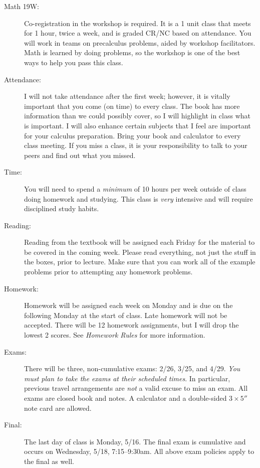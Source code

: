 \documentclass[letterpaper,12pt,fleqn]{article}
\begin{document}
\begin{description}
\item[Math 19W:] Co-registration in the workshop is required. It is a 1 unit
    class that meets for 1 hour, twice a week, and is graded CR/NC based on
    attendance. You will work in teams on precalculus problems, aided by
    workshop facilitators. Math is learned by doing problems, so the workshop
    is one of the best ways to help you pass this class.

\item[Attendance:] I will not take attendance after the first week; however, it
    is vitally important that you come (on time) to every class. The book has
    more information than we could possibly cover, so I will highlight in class
    what is important. I will also enhance certain subjects that I feel are
    important for your calculus preparation. Bring your book and calculator to
    every class meeting. If you miss a class, it is your responsibility to talk
    to your peers and find out what you missed.

\item[Time:] You will need to spend a \emph{minimum} of 10 hours per week
    outside of class doing homework and studying. This class is \emph{very}
    intensive and will require disciplined study habits.

\item[Reading:] Reading from the textbook will be assigned each Friday for the
    material to be covered in the coming week. Please read everything, not
    just the stuff in the boxes, prior to lecture. Make sure that you can work
    all of the example problems prior to attempting any homework problems.

\item[Homework:] Homework will be assigned each week on Monday and is due on
    the following Monday at the start of class. Late homework will not be
    accepted. There will be 12 homework assignments, but I will drop the lowest
    2 scores. See \emph{Homework Rules} for more information.

\item[Exams:] There will be three, non-cumulative exams: 2/26, 3/25, and 4/29.
    \emph{You must plan to take the exams at their scheduled times}. In
    particular, previous travel arrangements are \emph{not} a valid excuse to
    miss an exam. All exams are closed book and notes. A calculator and a
    double-sided $3\times5''$ note card are allowed.

\item[Final:] The last day of class is Monday, 5/16. The final exam is
    cumulative and occurs on Wednesday, 5/18, 7:15--9:30am. All above exam
    policies apply to the final as well.


\end{description}
\end{document}
